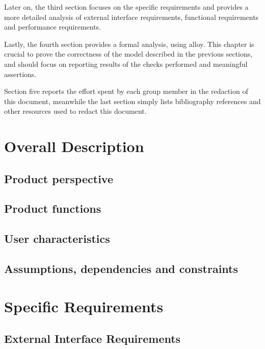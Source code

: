\documentclass{Configuration_Files/PoliMi3i_thesis}
\begin{document}
	Later on, the third section focuses on the specific requirements and provides a more detailed analysis of external interface requirements, functional requirements and performance requirements.
	
	Lastly, the fourth section provides a formal analysis, using alloy. This chapter is crucial to prove the correctness of the model described in the previous sections, and should focus on reporting results of the checks performed and meaningful assertions.
	
	Section five reports the effort spent by each group member in the redaction of this document, meanwhile the last section simply lists bibliography references and other resources used to redact this document.

    \chapter{Overall Description}\label{ch:overall_description}


    \section{Product perspective}\label{sec:product_perspective}


    \section{Product functions}\label{sec:product_functions}


    \section{User characteristics}\label{sec:user_characteristics}


    \section{Assumptions, dependencies and constraints}\label{sec:assumptions_dependencies_and_constraints}


    \chapter{Specific Requirements}\label{ch:specific_requirements}


    \section{External Interface Requirements}\label{sec:external_interface_requirements}
\end{document}
